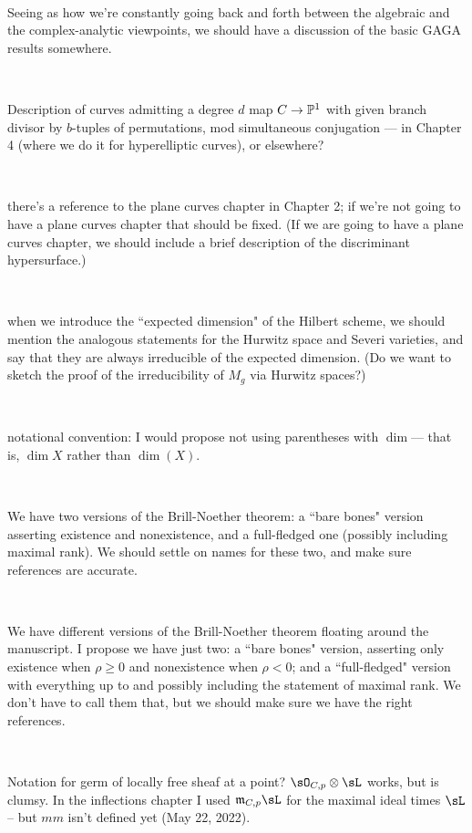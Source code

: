 \documentclass[12pt, leqno]{book}
\begin{document}
\

Seeing as how we're constantly going back and forth between the algebraic and the complex-analytic viewpoints,  we should have a discussion of the basic GAGA results somewhere.

\

Description of curves admitting a degree $d$ map $C \to \PP^1$ with given branch divisor by $b$-tuples of permutations, mod simultaneous conjugation --- in Chapter 4 (where we do it for hyperelliptic curves), or elsewhere?

\

there's a reference to the plane curves chapter in Chapter 2; if we're not going to have a plane curves chapter that should be fixed. (If we are going to have a plane curves chapter, we should include a brief description of the discriminant hypersurface.)

\

when we introduce the ``expected dimension" of the Hilbert scheme, we should mention the analogous statements for the Hurwitz space and Severi varieties, and say that they are always irreducible of the expected dimension. (Do we want to sketch the proof of the irreducibility of $M_g$ via Hurwitz spaces?)

\

notational convention: I would propose not using parentheses with $\dim$--- that is, $\dim X$ rather than $\dim(X)$.

\

We have two versions of the Brill-Noether theorem: a ``bare bones" version asserting existence and nonexistence, and a full-fledged one (possibly including maximal rank). We should settle on names for these two, and make sure references are accurate.

\

We have different versions of the Brill-Noether theorem floating around the manuscript. I propose we have just two: a ``bare bones" version, asserting only existence when $\rho \geq 0$ and nonexistence when $\rho < 0$; and a ``full-fledged" version with everything up to and possibly including the statement of maximal rank. We don't have to call them that, but we should make sure we have the right references. 


\ 

Notation for germ of locally free sheaf at a point? $\sO_{C,p}\otimes \sL$ works, but is clumsy. In the inflections chapter I used $\frak{m}_{C,p}\sL$ for the maximal ideal times $\sL$ -- but $mm$ isn't defined yet (May 22, 2022).
\end{document}

